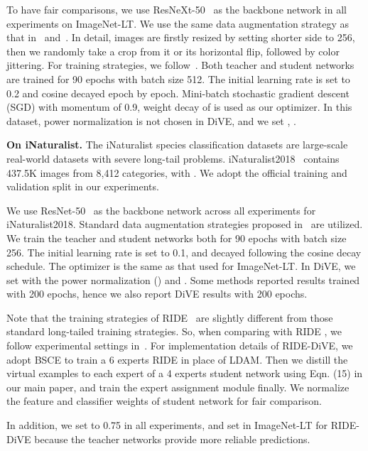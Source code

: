 \documentclass[10pt,twocolumn,letterpaper]{article}
\begin{document}
To have fair comparisons, we use ResNeXt-50~\cite{xie2017resnext} as the backbone network in all experiments on ImageNet-LT. We use the same data augmentation strategy as that in~\cite{liu2019openlongtailrecognition} and~\cite{kang2019decoupling}. In detail, images are firstly resized by setting shorter side to 256, then we randomly take a  crop from it or its horizontal flip, followed by color jittering. For training strategies, we follow~\cite{kang2019decoupling}. Both teacher and student networks are trained for 90 epochs with batch size 512. The initial learning rate is set to 0.2 and cosine decayed epoch by epoch. Mini-batch stochastic gradient descent (SGD) with momentum of 0.9, weight decay of  is used as our optimizer. In this dataset, power normalization is not chosen in DiVE, and we set , .

\textbf{On iNaturalist.}
The iNaturalist species classification datasets are large-scale real-world datasets with severe long-tail problems. iNaturalist2018~\cite{cui2018large} contains 437.5K images from 8,412 categories, with . We adopt the official training and validation split in our experiments.

We use ResNet-50~\cite{he2016deep} as the backbone network across all experiments for iNaturalist2018. Standard data augmentation strategies proposed in~\cite{goyal2017accurate} are utilized. We train the teacher and student networks both for 90 epochs with batch size 256. The initial learning rate is set to 0.1, and decayed following the cosine decay schedule. The optimizer is the same as that used for ImageNet-LT. In DiVE, we set  with the power normalization () and . Some methods reported results trained with 200 epochs, hence we also report DiVE results with 200 epochs.

Note that the training strategies of RIDE~\cite{wang2020long} are slightly different from those standard long-tailed training strategies. So, when comparing with RIDE \cite{wang2020long}, we follow experimental settings in~\cite{wang2020long}. For implementation details of RIDE-DiVE, we adopt BSCE to train a 6 experts RIDE in place of LDAM. Then we distill the virtual examples to each expert of a 4 experts student network using Eqn. (15) in our main paper, and train the expert assignment module finally. We normalize the feature and classifier weights of student network for fair comparison.

In addition, we set  to 0.75 in all experiments, and set  in ImageNet-LT for RIDE-DiVE because the teacher networks provide more reliable predictions.
\end{document}
